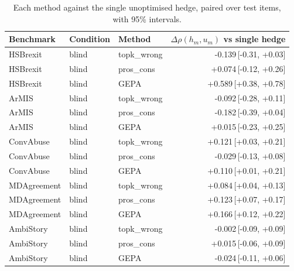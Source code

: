 \begin{table}[t]
\centering
\small
\begin{tabular}{lllr}
\hline
Benchmark & Condition & Method & $\Delta\rho(h_m,u_m)$ vs single hedge \\
\hline
HSBrexit & blind & topk\_wrong & -0.139{\scriptsize\,[-0.31, +0.03]} \\
HSBrexit & blind & pros\_cons & +0.074{\scriptsize\,[-0.12, +0.26]} \\
HSBrexit & blind & GEPA & +0.589{\scriptsize\,[+0.38, +0.78]} \\
ArMIS & blind & topk\_wrong & -0.092{\scriptsize\,[-0.28, +0.11]} \\
ArMIS & blind & pros\_cons & -0.182{\scriptsize\,[-0.39, +0.04]} \\
ArMIS & blind & GEPA & +0.015{\scriptsize\,[-0.23, +0.25]} \\
ConvAbuse & blind & topk\_wrong & +0.121{\scriptsize\,[+0.03, +0.21]} \\
ConvAbuse & blind & pros\_cons & -0.029{\scriptsize\,[-0.13, +0.08]} \\
ConvAbuse & blind & GEPA & +0.110{\scriptsize\,[+0.01, +0.21]} \\
MDAgreement & blind & topk\_wrong & +0.084{\scriptsize\,[+0.04, +0.13]} \\
MDAgreement & blind & pros\_cons & +0.123{\scriptsize\,[+0.07, +0.17]} \\
MDAgreement & blind & GEPA & +0.166{\scriptsize\,[+0.12, +0.22]} \\
AmbiStory & blind & topk\_wrong & -0.002{\scriptsize\,[-0.09, +0.09]} \\
AmbiStory & blind & pros\_cons & +0.015{\scriptsize\,[-0.06, +0.09]} \\
AmbiStory & blind & GEPA & -0.024{\scriptsize\,[-0.11, +0.06]} \\
\hline
\end{tabular}
\caption{Each method against the single unoptimised hedge, paired over test items, with 95\% intervals.}
\label{tab:paired-methods}
\end{table}